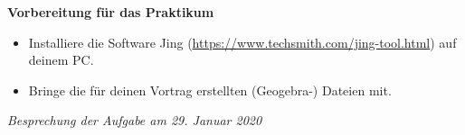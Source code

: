 \documentclass[a4paper,11pt]{scrreprt} %
\theoremstyle{definition} %
\begin{document}

\textbf{Vorbereitung für das Praktikum}
\begin{itemize}
    \item Installiere die Software Jing (\url{https://www.techsmith.com/jing-tool.html}) auf deinem PC.
    \item Bringe die für deinen Vortrag erstellten (Geogebra-) Dateien mit.
\end{itemize}




\vspace*{\fill} %

\begin{flushright}
\textit{Besprechung der Aufgabe am 29. Januar 2020}
\end{flushright}
\end{document}
